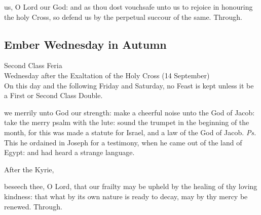 
\postcommunion
{} us, O Lord our God: and as thou dost vouchsafe unto us to rejoice in honouring the holy Cross, so defend us by the perpetual succour of the same. Through.


%
%  


\subsection{Ember Wednesday in Autumn}
\begin{inhead}
    {Second Class Feria\\
Wednesday after the Exaltation of the Holy Cross (14 September)\\
On this day and the following Friday and Saturday, no Feast is kept unless it be a First or Second Class Double.}
\end{inhead}
\par\noindent
\introit
{} we merrily unto God our strength: make a cheerful noise unto the God of Jacob: take the merry psalm with the lute: sound the trumpet in the beginning of the month, for this was made a statute for Israel, and a law of the God of Jacob. \textit{Ps.} This he ordained in Joseph for a testimony, when he came out of the land of Egypt: and had heard a strange language.
\begin{rubric}
    After the Kyrie,
\end{rubric}
\collect
{} beseech thee, O Lord, that our frailty may be upheld by the healing of thy loving kindness: that what by its own nature is ready to decay, may by thy mercy be renewed. Through.
